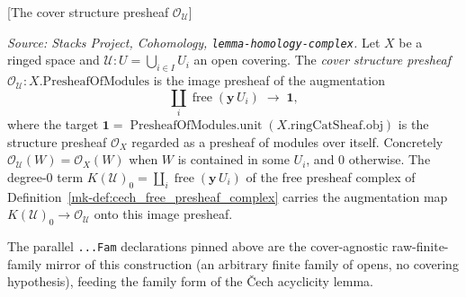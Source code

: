 \begin{definition}

[The cover structure presheaf \(\mathcal{O}_{\mathcal{U}}\)]
  \label{mk-def:cover_structure_presheaf}

  \textit{Source: Stacks Project, Cohomology, \texttt{lemma-homology-complex}.}
  Let \(X\) be a ringed space and \(\mathcal{U} : U = \bigcup_{i \in I} U_i\) an open
  covering. The \emph{cover structure presheaf} \(\mathcal{O}_{\mathcal{U}} :
  X.\mathrm{PresheafOfModules}\) is the image presheaf of the augmentation
  \[
    \coprod_i \operatorname{free}(\mathbf{y}\,U_i) \;\longrightarrow\; \mathbf{1},
  \]
  where the target \(\mathbf{1} = \operatorname{PresheafOfModules.unit}(
  X.\mathrm{ringCatSheaf}.\mathrm{obj})\) is the structure presheaf \(\mathcal{O}_X\)
  regarded as a presheaf of modules over itself. Concretely
  \(\mathcal{O}_{\mathcal{U}}(W) = \mathcal{O}_X(W)\) when \(W\) is contained in some
  \(U_i\), and \(0\) otherwise. The degree-\(0\) term
  \(K(\mathcal{U})_0 = \coprod_i \operatorname{free}(\mathbf{y}\,U_i)\) of the free
  presheaf complex of Definition~\ref{mk-def:cech_free_presheaf_complex} carries the
  augmentation map \(K(\mathcal{U})_0 \to \mathcal{O}_{\mathcal{U}}\) onto this image
  presheaf.

  The parallel \texttt{...Fam} declarations pinned above are the cover-agnostic
  raw-finite-family mirror of this construction (an arbitrary finite family of opens,
  no covering hypothesis), feeding the family form of the {\v C}ech acyclicity lemma.
\end{definition}

